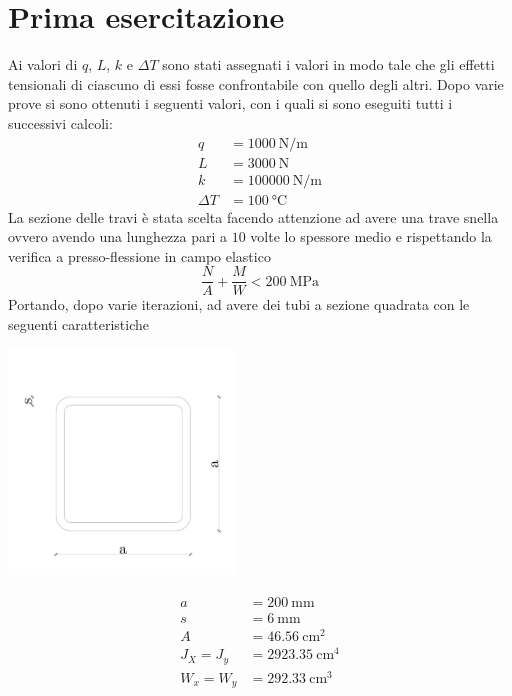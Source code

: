 \chapter{Prima esercitazione}

Ai valori di $q$, $L$, $k$ e $\Delta T$ sono stati assegnati i valori in modo tale che gli effetti  tensionali di ciascuno di essi fosse confrontabile con quello degli altri. 
Dopo varie prove si sono ottenuti i seguenti valori, con i quali si sono eseguiti tutti i successivi calcoli:
\begin{align*}
	q &= \SI{1000}{\newton \per \metre}\\
	L &= \SI{3000}{\newton}\\
	k &= \SI{100000}{\newton \per \metre}\\
	\Delta T &= \SI{100}{\celsius}
\end{align*}
La sezione delle travi è stata scelta facendo attenzione ad avere una trave snella ovvero avendo una lunghezza pari a $10$ volte lo spessore medio e rispettando la verifica a presso-flessione in campo elastico 
\[
\frac{N}{A} + \frac{M}{W} < \SI{200}{\mega\pascal}
\]
Portando, dopo varie iterazioni, ad avere dei tubi a sezione quadrata con le seguenti caratteristiche
\begin{center}
\begin{minipage}{6cm}
	\includegraphics[width=60mm]{img/tubi-quadri.pdf}
\end{minipage}
\begin{minipage}{6cm}
	\begin{align*}
		a &= \SI{200}{\milli\metre}\\
		s &= \SI{6}{\milli\metre}\\
		A &= \SI{46.56}{\centi\metre\squared}\\
		J_X = J_y &= \SI{2923.35}{\centi\metre\tothe{4}}\\
		W_x = W_y &= \SI{292.33}{\centi\metre\cubed}
	\end{align*}
\end{minipage}
\end{center}

